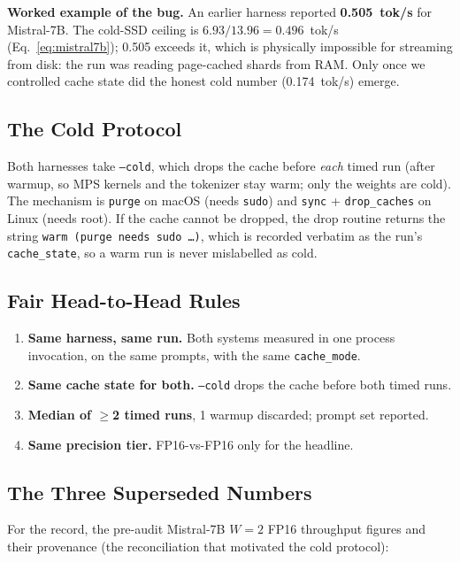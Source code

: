 \documentclass[10pt,a4paper]{article}
\begin{document}
\textbf{Worked example of the bug.} An earlier harness reported \textbf{0.505~tok/s}
for Mistral-7B. The cold-SSD ceiling is $6.93/13.96 = 0.496$~tok/s
(Eq.~\ref{eq:mistral7b}); 0.505 exceeds it, which is physically impossible for
streaming from disk: the run was reading page-cached shards from RAM. Only
once we controlled cache state did the honest cold number (0.174~tok/s) emerge.

\subsection{The Cold Protocol}
Both harnesses take \texttt{--cold}, which drops the cache before \emph{each} timed
run (after warmup, so MPS kernels and the tokenizer stay warm; only the weights
are cold). The mechanism is \texttt{purge} on macOS (needs \texttt{sudo}) and
\texttt{sync} + \texttt{drop\_caches} on Linux (needs root). If the cache cannot be
dropped, the drop routine returns the string \texttt{warm (purge needs sudo \ldots)},
which is recorded verbatim as the run's \texttt{cache\_state}, so a warm run is
never mislabelled as cold.

\subsection{Fair Head-to-Head Rules}
\begin{enumerate}[leftmargin=2em]
  \item \textbf{Same harness, same run.} Both systems measured in one process
    invocation, on the same prompts, with the same \texttt{cache\_mode}.
  \item \textbf{Same cache state for both.} \texttt{--cold} drops the cache before
    both timed runs.
  \item \textbf{Median of $\ge$2 timed runs}, 1 warmup discarded; prompt set reported.
  \item \textbf{Same precision tier.} FP16-vs-FP16 only for the headline.
\end{enumerate}

\subsection{The Three Superseded Numbers}
For the record, the pre-audit Mistral-7B $W=2$ FP16 throughput figures and their
provenance (the reconciliation that motivated the cold protocol):
\end{document}
